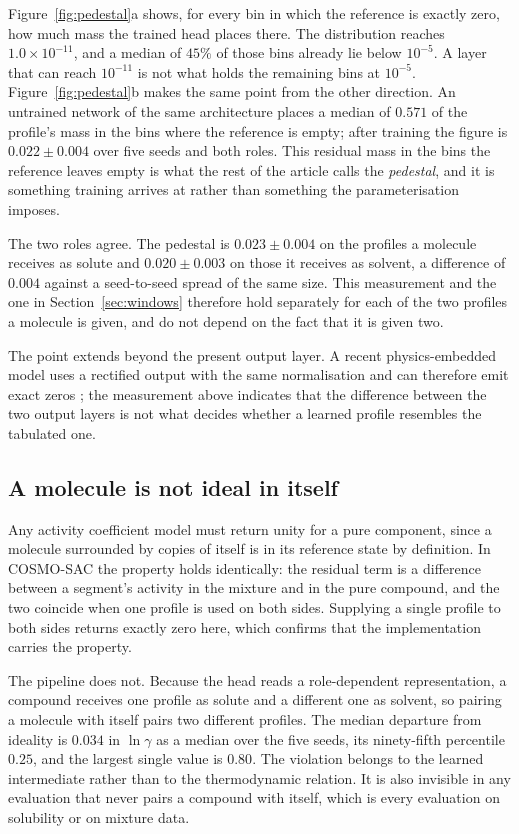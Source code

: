 Figure~\ref{fig:pedestal}a shows, for every bin in which the reference is exactly zero, how much
mass the trained head places there. The distribution reaches $1.0\times10^{-11}$, and a median of
$45\%$ of those bins already lie below $10^{-5}$. A layer that can reach $10^{-11}$ is
not what holds the remaining bins at $10^{-5}$. Figure~\ref{fig:pedestal}b makes the same point
from the other direction. An untrained network of the same architecture places a median of $0.571$
of the profile's mass in the bins where the reference is empty; after training the figure is
$0.022\pm0.004$ over five seeds and both roles. This residual mass in the bins the reference
leaves empty is what the rest of the article calls the \emph{pedestal}, and it is something
training arrives at rather than something the parameterisation imposes.

The two roles agree. The pedestal is $0.023\pm0.004$ on the profiles a molecule receives as solute
and $0.020\pm0.003$ on those it receives as solvent, a difference of $0.004$ against a
seed-to-seed spread of the same size. This measurement and the one in Section~\ref{sec:windows}
therefore hold separately for each of the two profiles a molecule is given, and do not depend on
the fact that it is given two.

The point extends beyond the present output layer. A recent physics-embedded model uses a
rectified output with the same normalisation and can therefore emit exact zeros
\cite{yang2025tennet}; the measurement above indicates that the difference between the two output
layers is not what decides whether a learned profile resembles the tabulated one.

\subsection{A molecule is not ideal in itself}
\label{sec:refstate}

Any activity coefficient model must return unity for a pure component, since a molecule surrounded
by copies of itself is in its reference state by definition. In COSMO-SAC the property holds
identically: the residual term is a difference between a segment's activity in the mixture and in
the pure compound, and the two coincide when one profile is used on both sides. Supplying a single
profile to both sides returns exactly zero here, which confirms that the implementation carries
the property.

The pipeline does not. Because the head reads a role-dependent representation, a compound receives
one profile as solute and a different one as solvent, so pairing a molecule with itself pairs two
different profiles. The median departure from ideality is $0.034$ in $\ln\gamma$ as a
median over the five seeds, its ninety-fifth percentile $0.25$, and the largest single value is
$0.80$. The violation belongs to the learned intermediate rather than to
the thermodynamic relation. It is also invisible in any evaluation that never pairs a compound
with itself, which is every evaluation on solubility or on mixture data.

